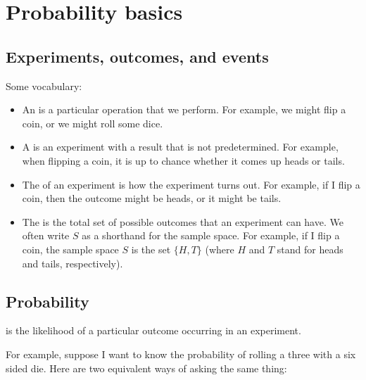 \documentclass[../../../main.tex]{subfiles}
\begin{document}
\chapter{Probability basics}



\section{Experiments, outcomes, and events}

Some vocabulary:

\begin{itemize}

  \item An  is a particular operation that we perform. For example, we might flip a coin, or we might roll some dice. 
  
  \item A  is an experiment with a result that is not predetermined. For example, when flipping a coin, it is up to chance whether it comes up heads or tails.

  \item The  of an experiment is how the experiment turns out. For example, if I flip a coin, then the outcome might be heads, or it might be tails. 
  
  \item The  is the total set of possible outcomes that an experiment can have. We often write $S$ as a shorthand for the sample space. For example, if I flip a coin, the sample space $S$ is the set $\{ H, T \}$ (where $H$ and $T$ stand for heads and tails, respectively). 

\end{itemize}


\section{Probability}

 is the likelihood of a particular outcome occurring in an experiment. 

For example, suppose I want to know the probability of rolling a three with a six sided die. Here are two equivalent ways of asking the same thing:
\end{document}
